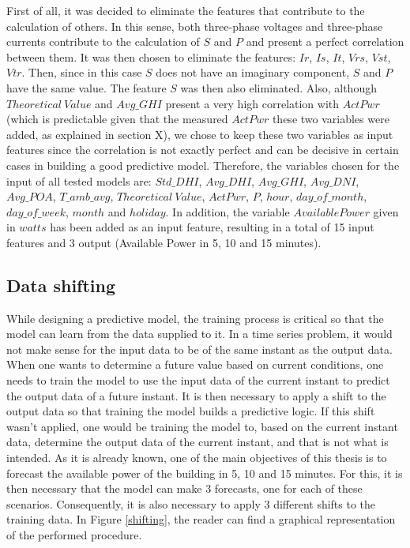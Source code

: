 First of all, it was decided to eliminate the features that contribute to the calculation of others. In this sense, both three-phase voltages and three-phase currents contribute to the calculation of $S$ and $P$ and present a perfect correlation between them. It was then chosen to eliminate the features: $Ir$, $Is$, $It$, $Vrs$, $Vst$, $Vtr$. Then, since in this case $S$ does not have an imaginary component, $S$ and $P$ have the same value. The feature $S$ was then also eliminated. Also, although $Theoretical\ Value$ and $Avg\_GHI$ present a very high correlation with $ActPwr$ (which is predictable given that the measured $ActPwr$ these two variables were added, as explained in section X), we chose to keep these two variables as input features since the correlation is not exactly perfect and can be decisive in certain cases in building a good predictive model. Therefore, the variables chosen for the input of all tested models are: $Std\_DHI$, $Avg\_DHI$, $Avg\_GHI$, $Avg\_DNI$, $Avg\_POA$, $T\_amb\_avg$, $Theoretical\ Value$, $ActPwr$, $P$, $hour$, $day\_of\_month$, $day\_of\_week$, $month$ and $holiday$. In addition, the variable $Available Power$ given in $watts$ has been added as an input feature, resulting in a total of 15 input features and 3 output (Available Power in 5, 10 and 15 minutes).


\subsection{Data shifting}

While designing a predictive model, the training process is critical so that the model can learn from the data supplied to it. In a time series problem, it would not make sense for the input data to be of the same instant as the output data. When one wants to determine a future value based on current conditions, one needs to train the model to use the input data of the current instant to predict the output data of a future instant. It is then necessary to apply a shift to the output data so that training the model builds a predictive logic. If this shift wasn't applied, one would be training the model to, based on the current instant data, determine the output data of the current instant, and that is not what is intended. As it is already known, one of the main objectives of this thesis is to forecast the available power of the building in 5, 10 and 15 minutes. For this, it is then necessary that the model can make 3 forecasts, one for each of these scenarios. Consequently, it is also necessary to apply 3 different shifts to the training data. In Figure \ref{shifting}, the reader can find a graphical representation of the performed procedure.


